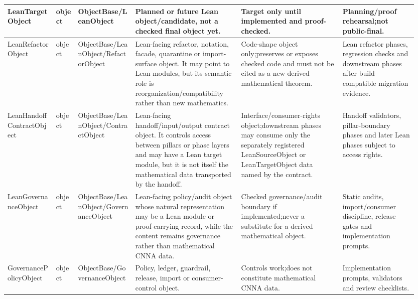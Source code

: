 \begin{longtable}{L{0.115\linewidth} L{0.055\linewidth} L{0.135\linewidth} L{0.245\linewidth} L{0.23\linewidth} L{0.17\linewidth}}
\hline
\addlinespace[0.24em]
LeanTargetObject & object & ObjectBase/\allowbreak{}LeanObject & Planned or future Lean object/\allowbreak{}candidate, not a checked final object yet. & Target only until implemented and proof-checked. & Planning/\allowbreak{}proof rehearsal;\newline not public-final.\\
\hline
\addlinespace[0.24em]
LeanRefactorObject & object & ObjectBase/\allowbreak{}LeanObject/\allowbreak{}RefactorObject & Lean-facing refactor, notation, facade, quarantine or import-surface object. It may point to Lean modules, but its semantic role is reorganization/\allowbreak{}compatibility rather than new mathematics. & Code-shape object only;\newline preserves or exposes checked code and must not be cited as a new derived mathematical theorem. & Lean refactor phases, regression checks and downstream phases after build-compatible migration evidence.\\
\hline
\addlinespace[0.24em]
LeanHandoffContractObject & object & ObjectBase/\allowbreak{}LeanObject/\allowbreak{}ContractObject & Lean-facing handoff/\allowbreak{}input/\allowbreak{}output contract object. It controls access between pillars or phase layers and may have a Lean target module, but it is not itself the mathematical data transported by the handoff. & Interface/\allowbreak{}consumer-rights object;\newline downstream phases may consume only the separately registered LeanSourceObject or LeanTargetObject data named by the contract. & Handoff validators, pillar-boundary phases and later Lean phases subject to access rights.\\
\hline
\addlinespace[0.24em]
LeanGovernanceObject & object & ObjectBase/\allowbreak{}LeanObject/\allowbreak{}GovernanceObject & Lean-facing policy/\allowbreak{}audit object whose natural representation may be a Lean module or proof-carrying record, while the content remains governance rather than mathematical CNNA data. & Checked governance/\allowbreak{}audit boundary if implemented;\newline never a substitute for a derived mathematical object. & Static audits, import/\allowbreak{}consumer discipline, release gates and implementation prompts.\\
\hline
\addlinespace[0.24em]
GovernancePolicyObject & object & ObjectBase/\allowbreak{}GovernanceObject & Policy, ledger, guardrail, release, import or consumer-control object. & Controls work;\newline does not constitute mathematical CNNA data. & Implementation prompts, validators and review checklists.\\

\end{longtable}
